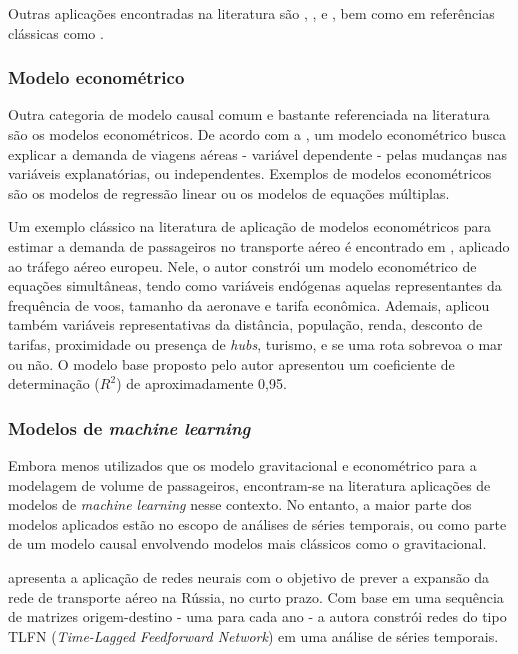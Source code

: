 \documentclass[a4paper,9pt,twocolumn,twoside,]{pinp}
\begin{document}
Outras aplicações encontradas na literatura são
\citet{verleger_models_1972}, \citet{cohen_gravity_2016}, e
\citet{boelrijk_gravity_2019}, bem como em referências clássicas como
\citet{kanafani_transportation_1983}.

\hypertarget{modelo-economuxe9trico}{%
\subsubsection{Modelo econométrico}\label{modelo-economuxe9trico}}

Outra categoria de modelo causal comum e bastante referenciada na
literatura são os modelos econométricos. De acordo com a
\citet{icao_doc_2006}, um modelo econométrico busca explicar a demanda
de viagens aéreas - variável dependente - pelas mudanças nas variáveis
explanatórias, ou independentes. Exemplos de modelos econométricos são
os modelos de regressão linear ou os modelos de equações múltiplas.

Um exemplo clássico na literatura de aplicação de modelos econométricos
para estimar a demanda de passageiros no transporte aéreo é encontrado
em \citet{jorge-calderon_demand_1997}, aplicado ao tráfego aéreo
europeu. Nele, o autor constrói um modelo econométrico de equações
simultâneas, tendo como variáveis endógenas aquelas representantes da
frequência de voos, tamanho da aeronave e tarifa econômica. Ademais,
\citet{jorge-calderon_demand_1997} aplicou também variáveis
representativas da distância, população, renda, desconto de tarifas,
proximidade ou presença de \emph{hubs}, turismo, e se uma rota sobrevoa
o mar ou não. O modelo base proposto pelo autor apresentou um
coeficiente de determinação (\(R^2\)) de aproximadamente 0,95.

\hypertarget{modelos-de-machine-learning}{%
\subsubsection{\texorpdfstring{Modelos de \emph{machine
learning}}{Modelos de machine learning}}\label{modelos-de-machine-learning}}

Embora menos utilizados que os modelo gravitacional e econométrico para
a modelagem de volume de passageiros, encontram-se na literatura
aplicações de modelos de \emph{machine learning} nesse contexto. No
entanto, a maior parte dos modelos aplicados estão no escopo de análises
de séries temporais, ou como parte de um modelo causal envolvendo
modelos mais clássicos como o gravitacional.

\citet{blinova_analysis_2007} apresenta a aplicação de redes neurais com
o objetivo de prever a expansão da rede de transporte aéreo na Rússia,
no curto prazo. Com base em uma sequência de matrizes origem-destino -
uma para cada ano - a autora constrói redes do tipo TLFN
(\emph{Time-Lagged Feedforward Network}) em uma análise de séries
temporais.
\end{document}
